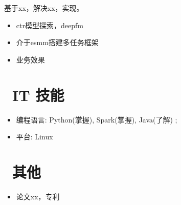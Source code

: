 \documentclass{resume}
\begin{document}

\begin{onehalfspacing}
基于xx，解决xx，实现。
\begin{itemize}
  \item ctr模型探索，deepfm
  \item 介于esmm搭建多任务框架
  \item 业务效果
\end{itemize}
\end{onehalfspacing}


\section{\faCogs\ IT 技能}
\begin{itemize}[parsep=0.5ex]
  \item 编程语言: Python(掌握), Spark(掌握), Java(了解) ; 
  \item 平台: Linux
\end{itemize}


\section{\faInfo\ 其他}
\begin{itemize}[parsep=0.5ex]
  \item 论文xx，专利
\end{itemize}

%
%
\end{document}
